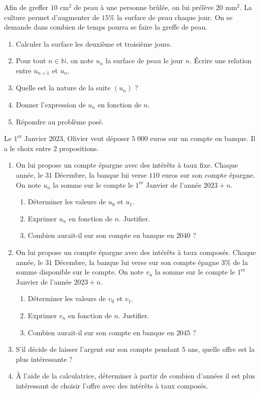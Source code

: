 \documentclass[11pt]{article}
\begin{document}
\begin{exo}
  Afin de greffer $10$ cm$^2$ de peau à une personne brûlée, on lui prélève $20$
  mm$^2$. La culture permet d'augmenter de $15$\% la surface de peau chaque
  jour. On se demande dans combien de temps pourra se faire la greffe de peau.
  \begin{enumerate}
    \item Calculer la surface les deuxième et troisième jours.
    \item Pour tout $n\in\mathbb{N}$, on note $u_n$ la surface de peau le jour
      $n$. Écrire une relation entre $u_{n+1}$ et $u_n$.
    \item Quelle est la nature de la suite $\left( u_n \right)$ ?
    \item Donner l'expression de $u_n$ en fonction de $n$.
    \item Répondre au problème posé.
  \end{enumerate}
\end{exo}

\begin{exo}
  Le $1^\text{er}$ Janvier $2023$, Olivier veut déposer $5\;000$ euros sur un
  compte en banque. Il a le choix entre $2$ propositions.
  \begin{enumerate}
    \item On lui propose un compte épargne avec des intérêts à taux fixe. Chaque
      année, le $31$ Décembre, la banque lui verse $110$ euros sur son compte
      épargne. On note $u_n$ la somme sur le compte le $1^\text{er}$ Janvier de
      l'année $2023+n$.
      \begin{enumerate}
        \item Déterminer les valeurs de $u_0$ et $u_1$.
        \item Exprimer $u_n$ en fonction de $n$. Justifier.
        \item Combien aurait-il sur son compte en banque en $2040$ ?
      \end{enumerate}
    \item On lui propose un compte épargne avec des intérêts à taux composés.
      Chaque année, le $31$ Décembre, la banque lui verse sur son compte épagne
      $3$\% de la somme disponible sur le compte. On note $v_n$ la somme sur le
      compte le $1^\text{er}$ Janvier de l'année $2023+n$.
      \begin{enumerate}
        \item Déterminer les valeurs de $v_0$ et $v_1$.
        \item Exprimer $v_n$ en fonction de $n$. Justifier.
        \item Combien aurait-il sur son compte en banque en $2045$ ?
      \end{enumerate}
    \item S'il décide de laisser l'argent sur son compte pendant $5$ ans, quelle
      offre est la plus intéressante ?
    \item À l'aide de la calculatrice, déterminer à partir de combien d'années
      il est plus intéressant de choisir l'offre avec des intérêts à taux
      composés.
  \end{enumerate}
\end{exo}
\end{document}
